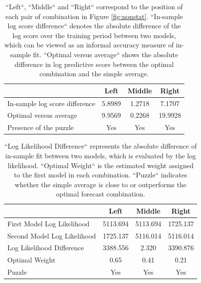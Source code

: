 \documentclass{monashthesis}
\begin{document}
\begin{table}[ht]
  \centering
    \begin{tabular}{l|ccc}
    \toprule
                                      &    Left     &   Middle    &    Right   \\
    \midrule
    In-sample log score difference    &   5.8989    &   1.2718    &   7.1707   \\
    Optimal versus average            &   9.9569    &   0.2268    &  19.9928   \\
    Presence of the puzzle            &   Yes       &   Yes       &   Yes      \\
    \bottomrule
    \end{tabular}
  \caption{``Left``, ``Middle`` and ``Right`` correspond to the position of each pair of combination in Figure \ref{fig:nonstat}. ``In-sample log score difference`` denotes the absolute difference of the log score over the training period between two models, which can be viewed as an informal accuracy measure of in-sample fit. ``Optimal versus average`` shows the absolute difference in log predictive score between the optimal combination and the simple average.}
  \label{tab:comparison1}
\end{table}

\begin{table}[ht]
  \centering
    \begin{tabular}{l|ccc}
    \toprule
                                      &        Left        &     Middle     &    Right       \\  
    \midrule
    First Model Log Likelihood        &     5113.694       &    5113.694    &   1725.137     \\
    Second Model Log Likelihood       &     1725.137       &    5116.014    &   5116.014     \\
    Log Likelihood Difference         &     3388.556       &     2.320      &   3390.876     \\
    Optimal Weight                    &       0.65         &      0.41      &     0.21       \\
    Puzzle                            &       Yes          &      Yes       &     Yes        \\
    \bottomrule
    \end{tabular}
  \caption{``Log Likelihood Difference`` represents the absolute difference of in-sample fit between two models, which is evaluated by the log likelihood. ``Optimal Weight`` is the estimated weight assigned to the first model in each combination. ``Puzzle`` indicates whether the simple average is close to or outperforms the optimal forecast combination.}
  \label{tab:nonfit}
\end{table}
\end{document}
